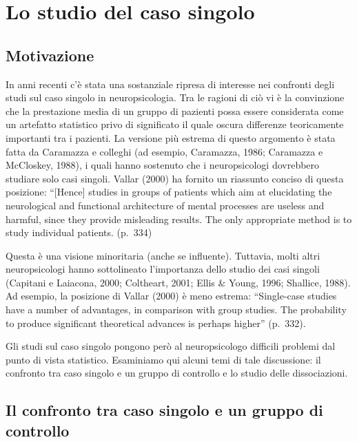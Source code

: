 \documentclass[
  11pt,
]{krantz}
\theoremstyle{definition}
\theoremstyle{definition}
\theoremstyle{definition}
\theoremstyle{definition}
\theoremstyle{remark}
\begin{document}
\hypertarget{ch:single_case}{%
\chapter{Lo studio del caso singolo}\label{ch:single_case}}

\hypertarget{sec:motivazione}{%
\section{Motivazione}\label{sec:motivazione}}

In anni recenti c'è stata una sostanziale ripresa di interesse nei confronti degli studi sul caso singolo in neuropsicologia. Tra le ragioni di ciò vi è la convinzione che la prestazione media di un gruppo di pazienti possa essere considerata come un artefatto statistico privo di significato il quale oscura differenze teoricamente importanti tra i pazienti. La versione più estrema di questo argomento è stata fatta da Caramazza e colleghi (ad esempio, Caramazza, 1986; Caramazza e McCloskey, 1988), i quali hanno sostenuto che i neuropsicologi dovrebbero studiare solo casi singoli. Vallar (2000) ha fornito un riassunto conciso di questa posizione: ``{[}Hence{]} studies in groups of patients which aim at elucidating the neurological and functional architecture of mental processes are useless and harmful, since they provide misleading results. The only appropriate method is to study individual patients. (p.~334)

Questa è una visione minoritaria (anche se influente). Tuttavia, molti altri neuropsicologi hanno sottolineato l'importanza dello studio dei casi singoli (Capitani e Laiacona, 2000; Coltheart, 2001; Ellis \& Young, 1996; Shallice, 1988). Ad esempio, la posizione di Vallar (2000) è meno estrema: ``Single-case studies have a number of advantages, in comparison with group studies. The probability to produce significant theoretical advances is perhaps higher'' (p.~332).

Gli studi sul caso singolo pongono però al neuropsicologo difficili problemi dal punto di vista statistico. Esaminiamo qui alcuni temi di tale discussione: il confronto tra caso singolo e un gruppo di controllo e lo studio delle dissociazioni.

\hypertarget{sec:comparison-single-case-controls}{%
\section{Il confronto tra caso singolo e un gruppo di controllo}\label{sec:comparison-single-case-controls}}
\end{document}

